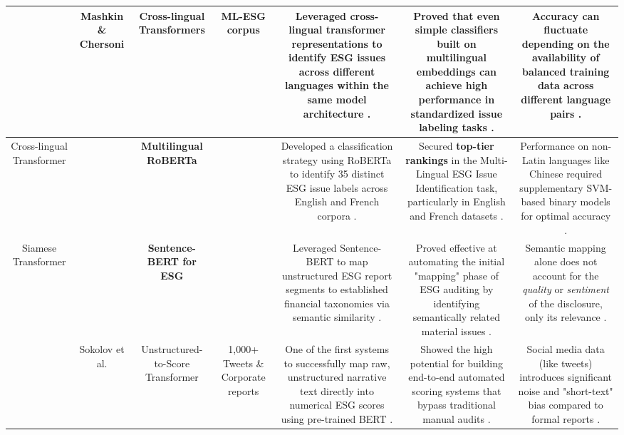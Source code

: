\documentclass{article}
\begin{document}
\begin{table}[h!]
\begin{tabular}{|c|c|c|c|c|c|c|}
~ & Mashkin \& Chersoni  \parencite{ivan_mashkin_fba24085} & \textbf{Cross-lingual Transformers} & ML-ESG corpus  \parencite{ivan_mashkin_fba24085} & Leveraged cross-lingual transformer representations to identify ESG issues across different languages within the same model architecture  \parencite{ivan_mashkin_fba24085}. & Proved that even simple classifiers built on multilingual embeddings can achieve high performance in standardized issue labeling tasks  \parencite{ivan_mashkin_fba24085}. & Accuracy can fluctuate depending on the availability of balanced training data across different language pairs  \parencite{ivan_mashkin_fba24085}. \\ \hline
Cross-lingual Transformer &  \parencite{elvys_linhares_pontes_fde4718b} & \textbf{Multilingual RoBERTa}  \parencite{elvys_linhares_pontes_fde4718b} & ~ & Developed a classification strategy using RoBERTa to identify 35 distinct ESG issue labels across English and French corpora  \parencite{elvys_linhares_pontes_fde4718b}. & Secured \textbf{top-tier rankings} in the Multi-Lingual ESG Issue Identification task, particularly in English and French datasets  \parencite{elvys_linhares_pontes_fde4718b}. & Performance on non-Latin languages like Chinese required supplementary SVM-based binary models for optimal accuracy  \parencite{elvys_linhares_pontes_fde4718b}. \\ \hline
Siamese Transformer & ~ & \textbf{Sentence-BERT for ESG}  \parencite{juyeon_kang_de009075} & ~ & Leveraged Sentence-BERT to map unstructured ESG report segments to established financial taxonomies via semantic similarity  \parencite{juyeon_kang_de009075}. & Proved effective at automating the initial "mapping" phase of ESG auditing by identifying semantically related material issues  \parencite{juyeon_kang_de009075}. & Semantic mapping alone does not account for the \textit{quality} or \textit{sentiment} of the disclosure, only its relevance  \parencite{juyeon_kang_de009075}. \\ \hline
~ & Sokolov et al.  \parencite[]{gregor_dorfleitner_320f79a0, juyeon_kang_de009075} & Unstructured-to-Score Transformer & 1,000+ Tweets \& Corporate reports  \parencite[]{gregor_dorfleitner_320f79a0, juyeon_kang_de009075} & One of the first systems to successfully map raw, unstructured narrative text directly into numerical ESG scores using pre-trained BERT  \parencite[]{gregor_dorfleitner_320f79a0, juyeon_kang_de009075}. & Showed the high potential for building end-to-end automated scoring systems that bypass traditional manual audits  \parencite{gregor_dorfleitner_320f79a0}. & Social media data (like tweets) introduces significant noise and "short-text" bias compared to formal reports  \parencite{juyeon_kang_de009075}. \\ \hline

\end{tabular}
\end{table}
\end{document}
